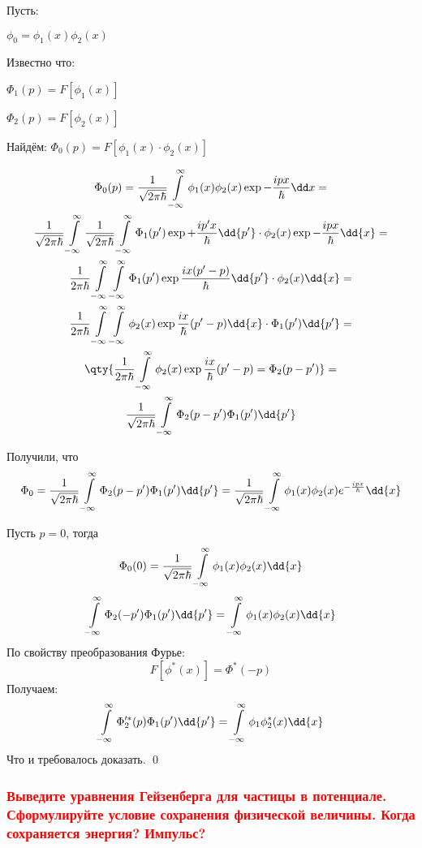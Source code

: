 \begin{flushleft}
	
Пусть:

$\phi_0=\phi_1(x)\phi_2(x)$

Известно что:

$\Phi_1(p)=F[\phi_1(x)]$

$\Phi_2(p)=F[\phi_2(x)]$

Найдём:
$\Phi_0(p)=F[\phi_1(x)\cdot\phi_2(x)]$

\end{flushleft}
\begin{gather*}
\Phi_0(p)=\frac{1}{\sqrt{2 \pi \hbar}} 
\infint \phi_1(x)\phi_2(x)\exp{-\frac{ipx}{\hbar}} \dd x =\\
\frac{1}{\sqrt{2 \pi \hbar}}
\infint \frac{1}{\sqrt{2 \pi \hbar}} 
\infint \Phi_1(p')\exp{+\frac{ip' x}{\hbar}}\dd{p'}\cdot \phi_2(x)\exp{-\frac{ipx}{\hbar}}\dd{x}=\\
\frac{1}{2\pi\hbar}
\infint \infint \Phi_1(p')
\exp{\frac{ix(p'-p)}{\hbar}}\dd{p'}
 \cdot\phi_2(x)\dd{x}=\\
\frac{1}{2\pi\hbar}
\infint\infint\phi_2(x)\exp{\frac{ix}{\hbar}(p'-p)}\dd{x}\cdot\Phi_1(p' )\dd{p'}=\\
\qty{\frac{1}{2\pi\hbar}\infint\phi_2(x)\exp{\frac{ix}{\hbar}(p'-p)}=\Phi_2(p-p')}=\\
\frac{1}{\sqrt{2\pi\hbar}}\infint \Phi_2(p-p')\Phi_1(p')\dd{p'}
\end{gather*}

Получили, что 
$$\Phi_0=\frac{1}{\sqrt{2\pi\hbar}}\infint \Phi_2(p-p')\Phi_1(p')\dd{p'}=
\frac{1}{\sqrt{2\pi\hbar}} \infint \phi_1(x)\phi_2(x) e^{-\frac{ipx}{\hbar}} \dd{x}$$

Пусть $p=0$, тогда 
$$\Phi_0(0)=\frac{1}{\sqrt{2\pi\hbar}} \infint \phi_1(x)\phi_2(x)\dd{x}$$
$$\infint \Phi_2(-p' )\Phi_1(p' )\dd{p'}= \infint \phi_1(x) \phi_2(x)\dd{x} $$
По свойству преобразования Фурье:
$$F[\phi^*(x)]=\Phi^*(-p) $$
Получаем:
$$\infint \Phi_2'^*(p)\Phi_1(p') \dd{p'} = \infint \phi_1 \phi^*_2(x) \dd{x} $$
Что и требовалось доказать. \qed

\subsubsection{\textcolor{red} {Выведите уравнения Гейзенберга для частицы в потенциале. Сформулируйте
условие сохранения физической величины. Когда сохраняется энергия? Импульс?} }